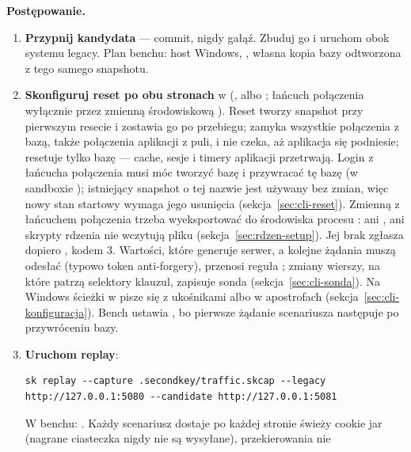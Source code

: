 \textbf{Postępowanie.}
\begin{enumerate}
  \item \textbf{Przypnij kandydata} --- commit, nigdy gałąź. Zbuduj go i uruchom obok
        systemu legacy. Plan benchu: host Windows, ,
        własna kopia bazy odtworzona z tego samego snapshotu.
  \item \textbf{Skonfiguruj reset po obu stronach} w 
        (,  albo ; łańcuch
        połączenia wyłącznie przez zmienną środowiskową ).
        Reset  tworzy snapshot przy pierwszym resecie i
        zostawia go po przebiegu; zamyka wszystkie połączenia z bazą, także połączenia
        aplikacji z puli, i nie czeka, aż aplikacja się podniesie; resetuje tylko bazę ---
        cache, sesje i timery aplikacji przetrwają. Login z łańcucha połączenia musi móc
        tworzyć bazę i przywracać tę bazę (w sandboxie ); istniejący
        snapshot o tej nazwie jest używany bez zmian, więc nowy stan startowy wymaga jego
        usunięcia (sekcja~\ref{sec:cli-reset}). Zmienną z łańcuchem połączenia trzeba
        wyeksportować do środowiska procesu : ani , ani skrypty
        rdzenia nie wczytują pliku  (sekcja~\ref{sec:rdzen-setup}). Jej brak
        zgłasza dopiero , kodem 3. Wartości, które generuje serwer,
        a kolejne żądania muszą odesłać (typowo token anti-forgery), przenosi reguła
        ; zmiany wierszy, na które patrzą selektory
         klauzul, zapisuje sonda 
        (sekcja~\ref{sec:cli-sonda}). Na Windows ścieżki w  pisze
        się z ukośnikami albo w apostrofach (sekcja~\ref{sec:cli-konfiguracja}). Bench
        ustawia , bo pierwsze żądanie scenariusza następuje po
        przywróceniu bazy.
  \item \textbf{Uruchom replay}:
\begin{lstlisting}
sk replay --capture .secondkey/traffic.skcap --legacy http://127.0.0.1:5080 --candidate http://127.0.0.1:5081
\end{lstlisting}
        W benchu: . Każdy scenariusz dostaje po każdej stronie
        świeży cookie jar (nagrane ciasteczka nigdy nie są wysyłane), przekierowania nie

\end{enumerate}
